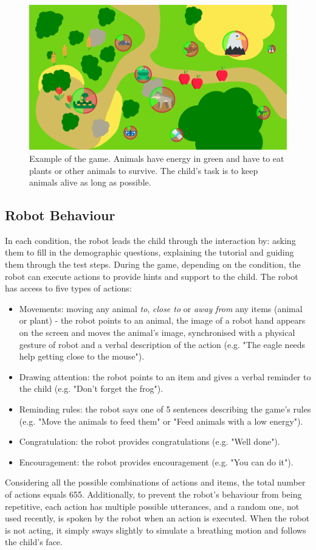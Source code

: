 \begin{figure}[ht]
	\centering
		\includegraphics[width=1\textwidth]{game.png}
		\caption{Example of the game. Animals have energy in green and have to eat plants or other animals to survive. The child's task is to keep animals alive as long as possible.}
		\label{fig:tutoring_game}
\end{figure}

\subsection{Robot Behaviour} \label{sec:tuto_robot}
In each condition, the robot leads the child through the interaction by: asking them to fill in the demographic questions, explaining the tutorial and guiding them through the test steps. During the game, depending on the condition, the robot can execute actions to provide hints and support to the child. The robot has access to five types of actions:
\begin{itemize}
	\item Movements: moving any animal \emph{to}, \emph{close to} or \emph{away from} any items (animal or plant) - the robot points to an animal, the image of a robot hand appears on the screen and moves the animal's image, synchronised with a physical gesture of robot and a verbal description of the action (e.g. "The eagle needs help getting close to the mouse").
	\item Drawing attention: the robot points to an item and gives a verbal reminder to the child (e.g. "Don't forget the frog").
	\item Reminding rules: the robot says one of 5 sentences describing the game's rules (e.g. "Move the animals to feed them" or "Feed animals with a low energy").
	\item Congratulation: the robot provides congratulations (e.g. "Well done").
	\item Encouragement: the robot provides encouragement (e.g. "You can do it").
\end{itemize}
Considering all the possible combinations of actions and items, the total number of actions equals 655. Additionally, to prevent the robot's behaviour from being repetitive, each action has multiple possible utterances, and a random one, not used recently, is spoken by the robot when an action is executed. When the robot is not acting, it simply sways slightly to simulate a breathing motion and follows the child's face. 


